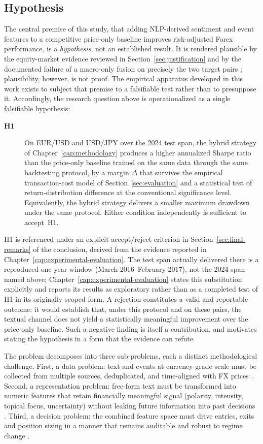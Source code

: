 \subsection*{Hypothesis} \label{sec:hypothesis}
The central premise of this study, that adding NLP-derived sentiment and event features to a competitive price-only baseline improves risk-adjusted Forex performance, is a \textit{hypothesis}, not an established result. It is rendered plausible by the equity-market evidence reviewed in Section~\ref{sec:justification} and by the documented failure of a macro-only fusion on precisely the two target pairs \cite{vanhelden2021fx}; plausibility, however, is not proof. The empirical apparatus developed in this work exists to subject that premise to a falsifiable test rather than to presuppose it. Accordingly, the research question above is operationalized as a single falsifiable hypothesis:
\begin{description}
  \item[\textbf{H1}] On EUR/USD and USD/JPY over the 2024 test span,
  the hybrid strategy of Chapter~\ref{cap:methodology} produces a higher
  annualized Sharpe ratio than the price-only baseline trained on the same
  data through the same backtesting protocol, by a margin $\Delta$ that
  survives the empirical transaction-cost model of Section~\ref{sec:evaluation}
  and a statistical test of return-distribution difference at the conventional
  significance level. Equivalently, the hybrid strategy delivers a smaller
  maximum drawdown under the same protocol. Either condition independently is
  sufficient to accept~H1.
\end{description}
H1 is referenced under an explicit accept/reject criterion in
Section~\ref{sec:final-remarks} of the conclusion, derived from the evidence
reported in Chapter~\ref{cap:experimental-evaluation}. The test span actually
delivered there is a reproduced one-year window (March 2016--February 2017),
not the 2024 span named above; Chapter~\ref{cap:experimental-evaluation}
states this substitution explicitly and reports its results as exploratory
rather than as a completed test of H1 in its originally scoped form.
A rejection constitutes
a valid and reportable outcome: it would establish that, under this protocol
and on these pairs, the textual channel does not yield a statistically
meaningful improvement over the price-only baseline. Such a negative finding
is itself a contribution, and motivates stating the hypothesis in a form that
the evidence can refute.

The problem decomposes into three sub-problems, each a distinct methodological challenge. First, a data problem: text and events at currency-grade scale must be collected from multiple sources, deduplicated, and time-aligned with FX prices \cite{leetaru2013gdelt}. Second, a representation problem: free-form text must be transformed into numeric features that retain financially meaningful signal (polarity, intensity, topical focus, uncertainty) without leaking future information into past decisions \cite{loughran2011liability,tetlock2007giving}. Third, a decision problem: the combined feature space must drive entries, exits and position sizing in a manner that remains auditable and robust to regime change \cite{lopezdeprado2018advances}.


